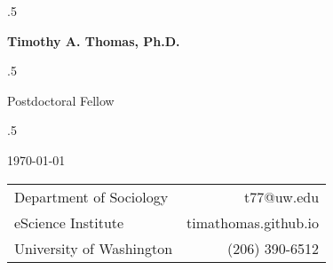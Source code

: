 \documentclass{resume} %
\begin{document}
\moveleft.5\hoffset\centerline{\LARGE\bf Timothy A. Thomas, Ph.D.} %
\vspace{5mm}
\moveleft.5\hoffset\centerline{Postdoctoral Fellow} %
\moveleft.5\hoffset\centerline{\today} %

\begin{center}
\begin{tabular}{l r}
Department of Sociology 	& \hspace{3in} t77@uw.edu \\
eScience Institute	    	& \hspace{3in} timathomas.github.io\\
University of Washington   	& \hspace{3in} (206) 390-6512
\end{tabular}
\vspace{5mm}
\end{center}

\end{document}
